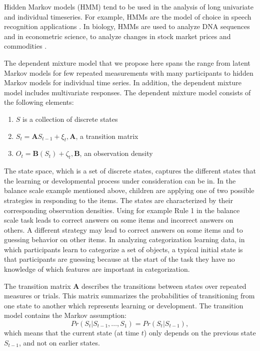 \documentclass[a4paper,12pt,man]{apa} %
\newcommand{\mat}{\mathbf}
\begin{document}
\nocite{McCutcheon1987}

Hidden Markov models (HMM) tend to be used in the analysis of long
univariate and individual timeseries.  For example, HMMs are the model
of choice in speech recognition applications \cite{Rabiner1989}.  In
biology, HMMs are used to analyze DNA sequences and in econometric
science, to analyze changes in stock market prices and commodities
\cite{Kim1994}.

The dependent mixture model that we propose here spans the range from
latent Markov models for few repeated measurements with many
participants to hidden Markov models for individual time series.  In
addition, the dependent mixture model includes multivariate responses.
The dependent mixture model consists of the following elements:
\begin{enumerate}
	\item $S$ is a collection of discrete states
	\item $S_{t} = \mat{A}S_{t-1}+\xi_{t}, \mat{A}$, a transition matrix
	\item $O_{t} = \mat{B}(S_{t}) + \zeta_{t}, \mat{B}$,  an observation density
\end{enumerate}

The state space, which is a set of discrete states, captures the
different states that the learning or developmental process under
consideration can be in.  In the balance scale example mentioned
above, children are applying one of two possible strategies in
responding to the items.  The states are characterized by their
corresponding observation densities.  Using for example Rule 1 in the
balance scale task leads to correct answers on some items and
incorrect answers on others.  A different strategy may lead to correct
answers on some items and to guessing behavior on other items.  In
analyzing categorization learning data, in which participants learn to
categorize a set of objects, a typical initial state is that
participants are guessing because at the start of the task they have
no knowledge of which features are important in categorization.

The transition matrix $\mat{A}$ describes the transitions between
states over repeated measures or trials.  This matrix summarizes the
probabilities of transitioning from one state to another which
represents learning or development.  The transition model contains the
Markov assumption:
$$Pr(S_{t}|S_{t-1}, \ldots, S_{1}) = Pr(S_{t}|S_{t-1}),$$
which means that the current state (at time $t$) only depends on the
previous state $S_{t-1}$, and not on earlier states.
\end{document}
